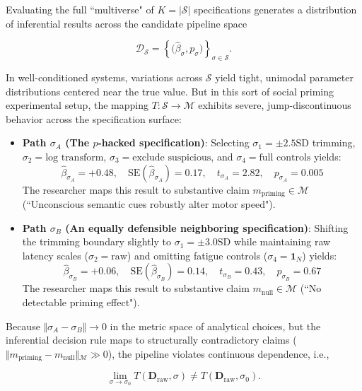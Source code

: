 \documentclass{article}
\theoremstyle{definition}
\begin{document}
\noindent
Evaluating the full ``multiverse" of $K = \vert{}\mathcal{S}\vert{}$ specifications generates a distribution of inferential results across the candidate pipeline space

\begin{equation}
\mathcal{D}_{\mathcal{S}} = \left\{ \big(\hat{\beta}_\sigma, p_\sigma\big) \right\}_{\sigma \in \mathcal{S}}.
\end{equation}

\noindent
In well-conditioned systems, variations across $\mathcal{S}$ yield tight, unimodal parameter distributions centered near the true value. But in this sort of social priming experimental setup, the mapping $T: \mathcal{S} \to \mathcal{M}$ exhibits severe, jump-discontinuous behavior across the specification surface:

\begin{itemize}
    \item \textbf{Path $\sigma_A$ (The $p$-hacked specification)}: Selecting $\sigma_1 = \pm 2.5\text{SD}$ trimming, $\sigma_2 = \text{log transform}$, $\sigma_3 = \text{exclude suspicious}$, and $\sigma_4 = \text{full controls}$ yields:$$\hat{\beta}_{\sigma_A} = +0.48, \quad \text{SE}(\hat{\beta}_{\sigma_A}) = 0.17, \quad t_{\sigma_A} = 2.82, \quad p_{\sigma_A} = 0.005$$The researcher maps this result to substantive claim $m_{\text{priming}} \in \mathcal{M}$ (``Unconscious semantic cues robustly alter motor speed").

    \item \textbf{Path $\sigma_B$ (An equally defensible neighboring specification)}: Shifting the trimming boundary slightly to $\sigma_1 = \pm 3.0\text{SD}$ while maintaining raw latency scales ($\sigma_2 = \text{raw}$) and omitting fatigue controls ($\sigma_4 = \mathbf{1}_N$) yields:$$\hat{\beta}_{\sigma_B} = +0.06, \quad \text{SE}(\hat{\beta}_{\sigma_B}) = 0.14, \quad t_{\sigma_B} = 0.43, \quad p_{\sigma_B} = 0.67$$The researcher maps this result to substantive claim $m_{\text{null}} \in \mathcal{M}$ (``No detectable priming effect").
\end{itemize}

\noindent
Because $\Vert{}\sigma_A - \sigma_B\Vert{} \to 0$ in the metric space of analytical choices, but the inferential decision rule maps to structurally contradictory claims ($\Vert{}m_{\text{priming}} - m_{\text{null}}\Vert{}_\mathcal{M} \gg 0$), the pipeline violates continuous dependence, i.e., 

\begin{equation}
\lim_{\sigma \to \sigma_0} T(\mathbf{D}_{\text{raw}}, \sigma) \neq T(\mathbf{D}_{\text{raw}}, \sigma_0).
\end{equation}
\end{document}

